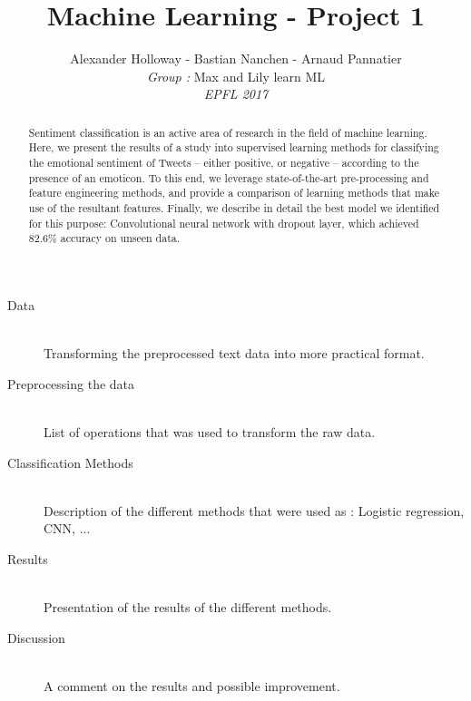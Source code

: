 \documentclass[10pt,conference,compsocconf]{IEEEtran}
\begin{document}
\title{Machine Learning - Project 1}
\author{
 Alexander Holloway - Bastian Nanchen - Arnaud Pannatier 
  \\
  \textit{Group : }Max and Lily learn ML \\
  \textit{EPFL 2017}
}
\maketitle

\begin{abstract}
Sentiment classification is an active area of research in the field of machine learning. Here, we present the results of a study into supervised learning methods for classifying the emotional sentiment of Tweets -- either positive, or negative -- according to the presence of an emoticon. To this end, we leverage state-of-the-art pre-processing and feature engineering methods, and provide a comparison of learning methods that make use of the resultant features. Finally, we describe in detail the best model we identified for this purpose: Convolutional neural network with dropout layer, which achieved 82.6\% accuracy on unseen data.
\end{abstract}

\begin{description}
\item[Data] \ \\
Transforming the preprocessed text data into more practical format. 
\item[Preprocessing the data] \ \\
List of operations that was used to transform the raw data.
\item[Classification Methods] \ \\
Description of the different methods that were used as : Logistic regression, CNN, ...
\item[Results] \ \\
Presentation of the results of the different methods.
\item[Discussion] \ \\
 A comment on the results and possible improvement.  
\end{description}









\end{document}
